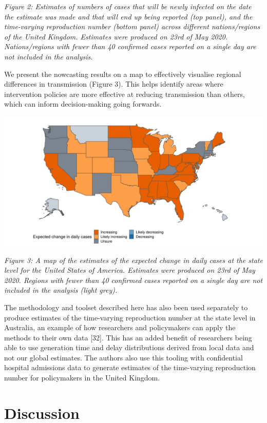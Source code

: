 \documentclass[]{article}
\begin{document}
\emph{Figure 2: Estimates of numbers of cases that will be newly
infected on the date the estimate was made and that will end up being
reported (top panel), and the time-varying reproduction number (bottom
panel) across different nations/regions of the United Kingdom. Estimates
were produced on 23rd of May 2020. Nations/regions with fewer than 40
confirmed cases reported on a single day are not included in the
analysis.}

We present the nowcasting results on a map to effectively visualise
regional differences in transmission (Figure 3). This helps identify
areas where intervention policies are more effective at reducing
transmission than others, which can inform decision-making going
forwards.

\includegraphics[width=0.9\linewidth]{figures/figure_3}

\emph{Figure 3: A map of the estimates of the expected change in daily
cases at the state level for the United States of America. Estimates
were produced on 23rd of May 2020. Regions with fewer than 40 confirmed
cases reported on a single day are not included in the analysis (light
grey).}

The methodology and toolset described here has also been used separately
to produce estimates of the time-varying reproduction number at the
state level in Australia, an example of how researchers and policymakers
can apply the methods to their own data {[}32{]}. This has an added
benefit of researchers being able to use generation time and delay
distributions derived from local data and not our global estimates. The
authors also use this tooling with confidential hospital admissions data
to generate estimates of the time-varying reproduction number for
policymakers in the United Kingdom.

\hypertarget{discussion}{%
\section{Discussion}\label{discussion}}
\end{document}
